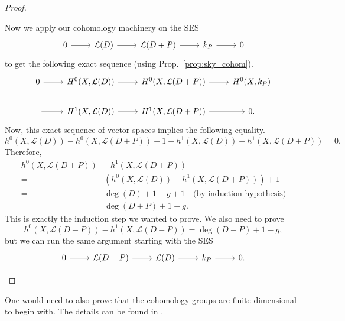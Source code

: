 \begin{proof}
\begin{description}[style=nextline]
          Now we apply our cohomology machinery on the SES
          \[
          \begin{tikzcd}
            0\arrow{r} & \mathcal{L}(D)\arrow{r} & \mathcal{L}(D+P)\arrow{r}
            & k_{P}\arrow{r} & 0
          \end{tikzcd}
          \]
          to get the following exact sequence (using
          Prop.~\ref{prop:sky_cohom}).
          \[
          \begin{tikzcd}
            0\arrow{r} & H^{0}(X, \mathcal{L}(D))\arrow{r}
            & H^{0}(X, \mathcal{L}(D+P))\arrow{r}
            & H^{0}(X, k_{P}) \\
            \arrow{r} & H^{1}(X, \mathcal{L}(D))\arrow{r}
            & H^{1}(X, \mathcal{L}(D+P))\arrow{r} & 0.
          \end{tikzcd}
          \]
          Now, this exact sequence of vector spaces implies the following
          equality.
          \[
          h^{0}(X,\mathcal{L}(D))-h^{0}(X, \mathcal{L}(D+P))
          +1-h^{1}(X,\mathcal{L}(D))+h^{1}(X,\mathcal{L}(D+P)) = 0.
          \]
          Therefore,
          \begin{align*}
            h^{0}(X,\mathcal{L}(D+P))&-h^{1}(X,\mathcal{L}(D+P)) \\
            =&\left(h^{0}(X,\mathcal{L}(D))-h^{1}(X,\mathcal{L}(D+P))\right)
              +1 \\
            =&\deg(D)+1-g+1\quad\text{(by induction hypothesis)} \\
            =&\deg(D+P)+1-g.
          \end{align*}
          This is exactly the induction step we wanted to prove.
          We also need to prove
          \[
            h^{0}(X,\mathcal{L}(D-P))-h^{1}(X,\mathcal{L}(D-P))
            =\deg(D-P)+1-g,
          \]
          but we can run the same argument starting with the SES
          \[
          \begin{tikzcd}
            0\arrow{r} & \mathcal{L}(D-P)\arrow{r} & \mathcal{L}(D)\arrow{r}
            & k_{P}\arrow{r} & 0.
          \end{tikzcd}
          \]
  \end{description}
\end{proof}
\begin{lwarn}
  One would need to also prove that the cohomology groups are finite
  dimensional to begin with. The details can be found in \cite{serre}.
\end{lwarn}


